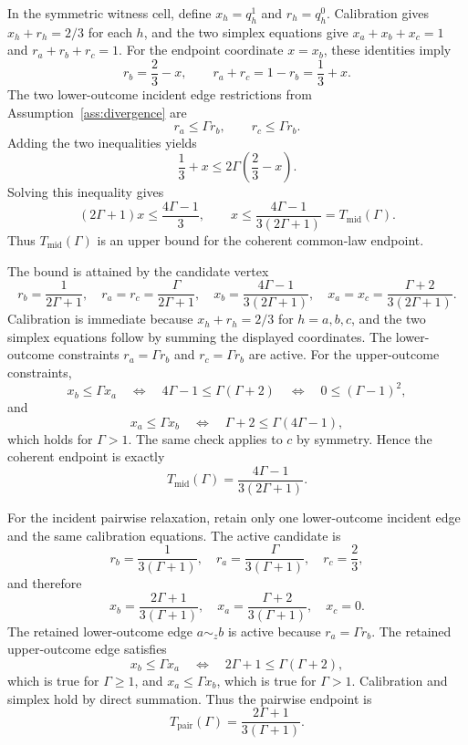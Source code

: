 \documentclass[11pt]{article}
\theoremstyle{definition}
\theoremstyle{plain}
\theoremstyle{remark}
\begin{document}
In the symmetric witness cell, define \(x_h=q_h^1\) and \(r_h=q_h^0\).  Calibration gives \(x_h+r_h=2/3\) for each \(h\), and the two simplex equations give \(x_a+x_b+x_c=1\) and \(r_a+r_b+r_c=1\).  For the endpoint coordinate \(x=x_b\), these identities imply
\[
  r_b=\frac23-x,\qquad r_a+r_c=1-r_b=\frac13+x.
\]
The two lower-outcome incident edge restrictions from Assumption~\ref{ass:divergence} are
\[
  r_a\le \Gamma r_b,\qquad r_c\le \Gamma r_b.
\]
Adding the two inequalities yields
\[
  \frac13+x\le 2\Gamma\left(\frac23-x\right).
\]
Solving this inequality gives
\[
  (2\Gamma+1)x\le \frac{4\Gamma-1}{3},
  \qquad
  x\le \frac{4\Gamma-1}{3(2\Gamma+1)}
  =
  T_{\mathrm{mid}}(\Gamma).
\]
Thus \(T_{\mathrm{mid}}(\Gamma)\) is an upper bound for the coherent common-law endpoint.

The bound is attained by the candidate vertex
\[
  r_b=\frac{1}{2\Gamma+1},\quad
  r_a=r_c=\frac{\Gamma}{2\Gamma+1},\quad
  x_b=\frac{4\Gamma-1}{3(2\Gamma+1)},\quad
  x_a=x_c=\frac{\Gamma+2}{3(2\Gamma+1)}.
\]
Calibration is immediate because \(x_h+r_h=2/3\) for \(h=a,b,c\), and the two simplex equations follow by summing the displayed coordinates.  The lower-outcome constraints \(r_a=\Gamma r_b\) and \(r_c=\Gamma r_b\) are active.  For the upper-outcome constraints,
\[
  x_b\le \Gamma x_a
  \quad\Longleftrightarrow\quad
  4\Gamma-1\le \Gamma(\Gamma+2)
  \quad\Longleftrightarrow\quad
  0\le(\Gamma-1)^2,
\]
and
\[
  x_a\le \Gamma x_b
  \quad\Longleftrightarrow\quad
  \Gamma+2\le \Gamma(4\Gamma-1),
\]
which holds for \(\Gamma>1\).  The same check applies to \(c\) by symmetry.  Hence the coherent endpoint is exactly
\[
  T_{\mathrm{mid}}(\Gamma)=\frac{4\Gamma-1}{3(2\Gamma+1)}.
\]

For the incident pairwise relaxation, retain only one lower-outcome incident edge and the same calibration equations.  The active candidate is
\[
  r_b=\frac{1}{3(\Gamma+1)},\quad
  r_a=\frac{\Gamma}{3(\Gamma+1)},\quad
  r_c=\frac23,
\]
and therefore
\[
  x_b=\frac{2\Gamma+1}{3(\Gamma+1)},\quad
  x_a=\frac{\Gamma+2}{3(\Gamma+1)},\quad
  x_c=0.
\]
The retained lower-outcome edge \(a\sim_z b\) is active because \(r_a=\Gamma r_b\).  The retained upper-outcome edge satisfies
\[
  x_b\le \Gamma x_a
  \quad\Longleftrightarrow\quad
  2\Gamma+1\le \Gamma(\Gamma+2),
\]
which is true for \(\Gamma\ge 1\), and \(x_a\le \Gamma x_b\), which is true for \(\Gamma>1\).  Calibration and simplex hold by direct summation.  Thus the pairwise endpoint is
\[
  T_{\mathrm{pair}}(\Gamma)=\frac{2\Gamma+1}{3(\Gamma+1)}.
\]
\end{document}
